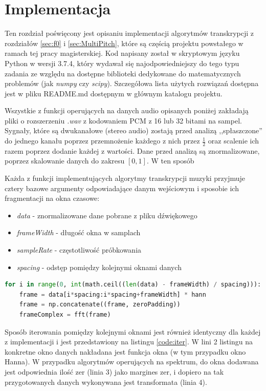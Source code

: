 \documentclass[12pt,a4paper,twoside]{mwart}
\begin{document}
\section{Implementacja}\label{sec:impl}
Ten rozdział poświęcony jest opisaniu implementacji algorytmów transkrypcji z rozdziałów \ref{sec:f0} i \ref{sec:MultiPitch}, które są częścią projektu powstałego w ramach tej pracy magisterskiej. Kod napisany został w skryptowym języku Python w wersji 3.7.4, który wydawał się najodpowiedniejszy do tego typu zadania ze względu na dostępne biblioteki dedykowane do matematycznych problemów (jak \textit{numpy} czy \textit{scipy}). Szczegółowa lista użytych rozwiązań dostępna jest w pliku README.md dostępnym w głównym katalogu projektu.

Wszystkie z funkcji operujących na danych audio opisanych poniżej zakładają pliki  o rozszerzeniu \textit{.wav} z kodowaniem PCM z 16 lub 32 bitami na sampel. Sygnały, które są dwukanałowe (stereo audio) zostają przed analizą ,,spłaszczone'' do jednego kanału poprzez przemnożenie każdego z nich przez $\frac{1}{2}$ oraz scalenie ich razem poprzez dodanie każdej z wartości. Dane przed analizą są znormalizowane, poprzez skalowanie danych do zakresu $\left[0, 1\right]$. W ten sposób

Każda z funkcji implementujących algorytmy transkrypcji muzyki przyjmuje cztery bazowe argumenty odpowiadające danym wejściowym i sposobie ich fragmentacji na okna czasowe:
\begin{itemize}
  \item \textit{data} - znormalizowane dane pobrane z pliku dźwiękowego
  \item \textit{frameWidth} - długość okna w samplach
  \item \textit{sampleRate} - częstotliwość próbkowania
  \item \textit{spacing} - odstęp pomiędzy kolejnymi oknami danych
\end{itemize}

\begin{lstlisting}[language=Python, caption={Przykład pętli po danych wejściowych z uwzględnieniem okna czasowego}, captionpos=b, label={code:iter}]
  for i in range(0, int(math.ceil((len(data) - frameWidth) / spacing))):
    frame = data[i*spacing:i*spacing+frameWidth] * hann
    frame = np.concatenate((frame, zeroPadding))
    frameComplex = fft(frame)
\end{lstlisting}

Sposób iterowania pomiędzy kolejnymi oknami jest również identyczny dla każdej z implementacji i jest przedstawiony na listingu \ref{code:iter}. W lini 2 listingu na konkretne okno danych nakładana jest funkcja okna (w tym przypadku okno Hanna). W przypadku algorytmów operujących na spektrum, do okna dodawana jest odpowiednia ilość zer (linia 3) jako margines zer, i dopiero na tak przygotowanych danych wykonywana jest transformata (linia 4).
\end{document}
